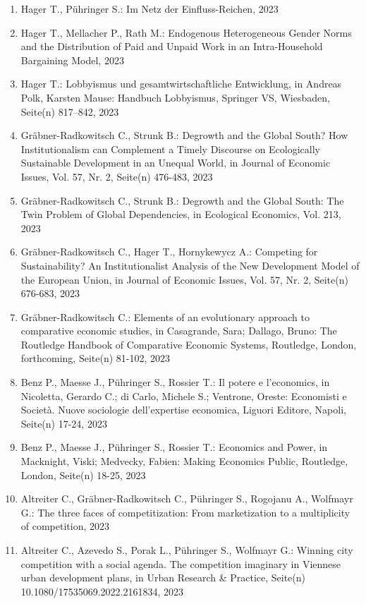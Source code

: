 \begin{enumerate}
	 \item Hager T., Pühringer S.: Im Netz der Einfluss-Reichen, 2023
	 \item Hager T., Mellacher P., Rath M.: Endogenous Heterogeneous Gender Norms and the Distribution of Paid and Unpaid Work in an Intra-Household Bargaining Model, 2023
	 \item Hager T.: Lobbyismus und gesamtwirtschaftliche Entwicklung, in Andreas Polk, Karsten Mause: Handbuch Lobbyismus, Springer VS, Wiesbaden, Seite(n) 817–842, 2023
	 \item Gräbner-Radkowitsch C., Strunk B.: Degrowth and the Global South? How Institutionalism can Complement a Timely Discourse on Ecologically Sustainable Development in an Unequal World, in Journal of Economic Issues, Vol. 57, Nr. 2, Seite(n) 476-483, 2023
	 \item Gräbner-Radkowitsch C., Strunk B.: Degrowth and the Global South: The Twin Problem of Global Dependencies, in Ecological Economics, Vol. 213, 2023
	 \item Gräbner-Radkowitsch C., Hager T., Hornykewycz A.: Competing for Sustainability? An Institutionalist Analysis of the New Development Model of the European Union, in Journal of Economic Issues, Vol. 57, Nr. 2, Seite(n) 676-683, 2023
	 \item Gräbner-Radkowitsch C.: Elements of an evolutionary approach to comparative economic studies, in Casagrande, Sara; Dallago, Bruno: The Routledge Handbook of Comparative Economic Systems, Routledge, London, forthcoming, Seite(n) 81-102, 2023
	 \item Benz P., Maesse J., Pühringer S., Rossier T.: Il potere e l'economics, in Nicoletta, Gerardo C.; di Carlo, Michele S.; Ventrone, Oreste: Economisti e Società. Nuove sociologie dell'expertise economica, Liguori Editore, Napoli, Seite(n) 17-24, 2023
	 \item Benz P., Maesse J., Pühringer S., Rossier T.: Economics and Power, in Macknight, Viski; Medvecky, Fabien: Making Economics Public, Routledge, London, Seite(n) 18-25, 2023
	 \item Altreiter C., Gräbner-Radkowitsch C., Pühringer S., Rogojanu A., Wolfmayr G.: The three faces of competitization: From marketization to a multiplicity of competition, 2023
	 \item Altreiter C., Azevedo S., Porak L., Pühringer S., Wolfmayr G.: Winning city competition with a social agenda. The competition imaginary in Viennese urban development plans, in Urban Research \& Practice, Seite(n) 10.1080/17535069.2022.2161834, 2023

\end{enumerate}
